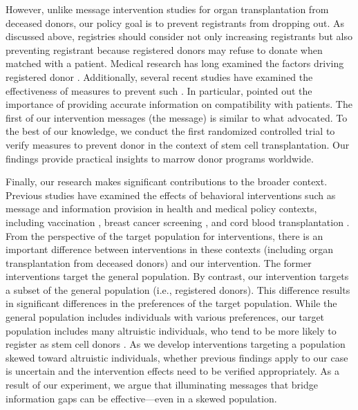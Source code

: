\documentclass[12pt, a4paper]{article}
\newcommand{\revise}[1]{{\color{red}{#1}}}
\begin{document}
However, unlike message intervention studies for organ transplantation from deceased donors, our policy goal is to prevent registrants from dropping out. As discussed above, registries should consider not only increasing registrants but also preventing registrant \revise{dropout} because registered donors may refuse to donate when matched with a patient. Medical research has long examined the factors driving registered donor \revise{dropout} \citep{Switzer2003, Switzer2004, Balassa2019, Hamed2023}. Additionally, several recent studies have examined the effectiveness of measures to prevent such \revise{dropout} \citep{Switzer2018, Haylock2024}. In particular, \citet{Switzer2018} pointed out the importance of providing accurate information on compatibility with patients. The first of our intervention messages (the \revise{matching difficulty} message) is similar to what \citet{Switzer2018} advocated. To the best of our knowledge, we conduct the first randomized controlled trial to verify measures to prevent donor \revise{dropout} in the context of stem cell transplantation. Our findings provide practical insights to marrow donor programs worldwide.

Finally, our research makes significant contributions to the broader context. Previous studies have examined the effects of behavioral interventions such as message and information provision in health and medical policy contexts, including vaccination \citep[for example,][]{Dai2021, Milkman2021}, breast cancer screening \citep{Bertoni2020}, and cord blood transplantation \citep{Grieco2018}. From the perspective of the target population for interventions, there is an important difference between interventions in these contexts (including organ transplantation from deceased donors) and our intervention. The former interventions target the general population. By contrast, our intervention targets a subset of the general population (i.e., registered donors). This difference results in significant differences in the preferences of the target population. While the general population includes individuals with various preferences, our target population includes many altruistic individuals, who tend to be more likely to register as stem cell donors \citep{Bergstrom2009, Ohtake2020}. As we develop interventions targeting a population skewed toward altruistic individuals, whether previous findings apply to our case is uncertain and the intervention effects need to be verified appropriately. As a result of our experiment, we argue that illuminating messages that bridge information gaps can be effective---even in a skewed population.
\end{document}
